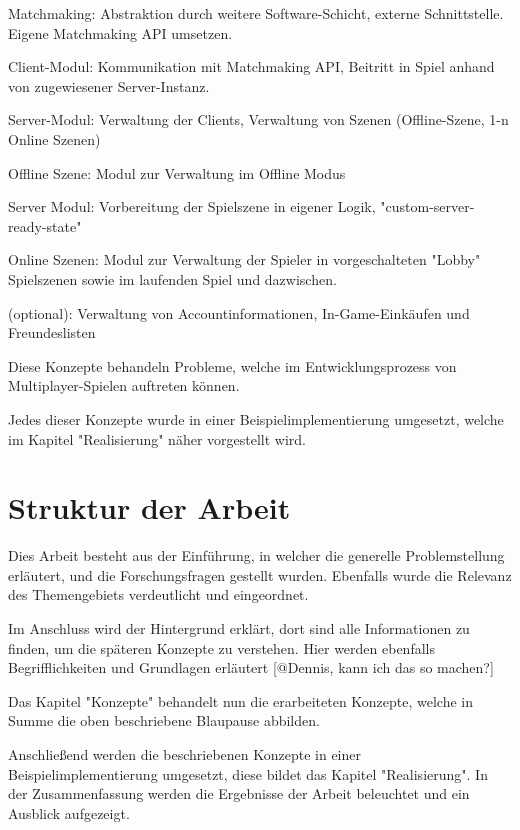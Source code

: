 Matchmaking: Abstraktion durch weitere Software-Schicht, externe Schnittstelle. Eigene Matchmaking API umsetzen.

Client-Modul: Kommunikation mit Matchmaking API, Beitritt in Spiel anhand von zugewiesener Server-Instanz.

Server-Modul: Verwaltung der Clients, Verwaltung von Szenen (Offline-Szene, 1-n Online Szenen)

Offline Szene: Modul zur Verwaltung im Offline Modus

Server Modul: Vorbereitung der Spielszene in eigener Logik, "custom-server-ready-state"

Online Szenen: Modul zur Verwaltung der Spieler in vorgeschalteten "Lobby" Spielszenen sowie im laufenden Spiel und dazwischen.

(optional): Verwaltung von Accountinformationen, In-Game-Einkäufen und Freundeslisten

Diese Konzepte behandeln Probleme, welche im Entwicklungsprozess von Multiplayer-Spielen auftreten können. 

Jedes dieser Konzepte wurde in einer Beispielimplementierung umgesetzt, welche im Kapitel "Realisierung" näher vorgestellt wird.

\section{Struktur der Arbeit}

Dies Arbeit besteht aus der Einführung, in welcher die generelle Problemstellung erläutert, und die Forschungsfragen gestellt wurden. Ebenfalls wurde die Relevanz des Themengebiets verdeutlicht und eingeordnet.

Im Anschluss wird der Hintergrund erklärt, dort sind alle Informationen zu finden, um die späteren Konzepte zu verstehen. Hier werden ebenfalls Begrifflichkeiten und Grundlagen erläutert [@Dennis, kann ich das so machen?]

Das Kapitel "Konzepte" behandelt nun die erarbeiteten Konzepte, welche in Summe die oben beschriebene Blaupause abbilden. 
 
Anschließend werden die beschriebenen Konzepte in einer Beispielimplementierung umgesetzt, diese bildet das Kapitel "Realisierung". In der Zusammenfassung werden die Ergebnisse der Arbeit beleuchtet und ein Ausblick aufgezeigt.
